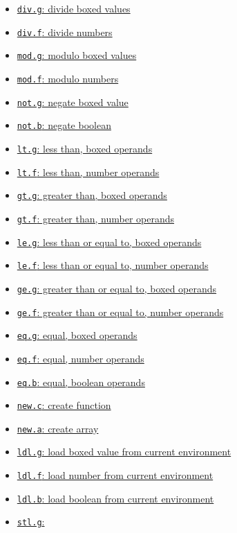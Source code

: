 \begin{itemize}
\begin{itemize}
\begin{itemize}
\item \hyperref[sec:org97eb268]{\texttt{div.g}: divide boxed values}
\item \hyperref[sec:org9ea386e]{\texttt{div.f}: divide numbers}
\item \hyperref[sec:org6afbbf6]{\texttt{mod.g}: modulo boxed values}
\item \hyperref[sec:orgf4bf035]{\texttt{mod.f}: modulo numbers}
\item \hyperref[sec:org4404772]{\texttt{not.g}: negate boxed value}
\item \hyperref[sec:org446322c]{\texttt{not.b}: negate boolean}
\item \hyperref[sec:org5479aa3]{\texttt{lt.g}: less than, boxed
operands}
\item \hyperref[sec:orga91f7a6]{\texttt{lt.f}: less than, number
operands}
\item \hyperref[sec:orge89bbc6]{\texttt{gt.g}: greater than, boxed
operands}
\item \hyperref[sec:org3ea3931]{\texttt{gt.f}: greater than,
number operands}
\item \hyperref[sec:orgf9e2550]{\texttt{le.g}: less than
or equal to, boxed operands}
\item \hyperref[sec:orgef83a7a]{\texttt{le.f}: less than
or equal to, number operands}
\item \hyperref[sec:org7e275af]{\texttt{ge.g}: greater
than or equal to, boxed operands}
\item \hyperref[sec:org24757e3]{\texttt{ge.f}: greater
than or equal to, number operands}
\item \hyperref[sec:orgb222de9]{\texttt{eq.g}: equal, boxed operands}
\item \hyperref[sec:orge0a190c]{\texttt{eq.f}: equal, number operands}
\item \hyperref[sec:org73ca0ae]{\texttt{eq.b}: equal, boolean operands}
\item \hyperref[sec:org1d41a06]{\texttt{new.c}: create function}
\item \hyperref[sec:orgcc2c694]{\texttt{new.a}: create array}
\item \hyperref[sec:orgbae78d9]{\texttt{ldl.g}: load
boxed value from current environment}
\item \hyperref[sec:orgb7a98c2]{\texttt{ldl.f}: load
number from current environment}
\item \hyperref[sec:org671ebc7]{\texttt{ldl.b}: load
boolean from current environment}
\item \hyperref[sec:org466d475]{\texttt{stl.g}:
}
\end{itemize}
\end{itemize}
\end{itemize}
